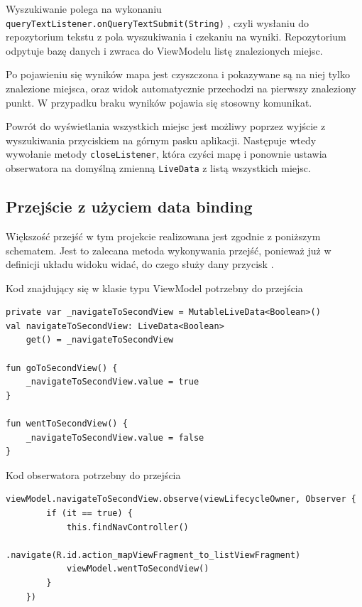 \documentclass[polish,polish,a4paper,12pt]{article}
\begin{document}
	Wyszukiwanie polega na wykonaniu \texttt{queryTextListener.onQueryTextSubmit(String)} \cite{androidapi}, czyli wysłaniu do repozytorium tekstu z pola wyszukiwania i czekaniu na wyniki. Repozytorium odpytuje bazę danych i zwraca do ViewModelu listę znalezionych miejsc.

	Po pojawieniu się wyników mapa jest czyszczona i pokazywane są na niej tylko znalezione miejsca, oraz widok automatycznie przechodzi na pierwszy znaleziony punkt. W przypadku braku wyników pojawia się stosowny komunikat.

	Powrót do wyświetlania wszystkich miejsc jest możliwy poprzez wyjście z wyszukiwania przyciskiem na górnym pasku aplikacji. Następuje wtedy wywołanie metody \texttt{closeListener}, która czyści mapę i ponownie ustawia obserwatora na domyślną zmienną \texttt{LiveData} z listą wszystkich miejsc.

	\subsection{Przejście z użyciem data binding}\label{navigation}

	Większość przejść w tym projekcie realizowana jest zgodnie z poniższym schematem. Jest to zalecana metoda wykonywania przejść, ponieważ już w definicji układu widoku widać, do czego służy dany przycisk \cite{kotlin}.

	\begin{listing}[H]
		\caption{Kod znajdujący się w klasie typu ViewModel potrzebny do przejścia}
		\begin{verbatim}
private var _navigateToSecondView = MutableLiveData<Boolean>()
val navigateToSecondView: LiveData<Boolean>
	get() = _navigateToSecondView

fun goToSecondView() {
	_navigateToSecondView.value = true
}

fun wentToSecondView() {
	_navigateToSecondView.value = false
}
		\end{verbatim}
		\label{listing:navigationviewmodel}
	\end{listing}

	\begin{listing}[H]
		\caption{Kod obserwatora potrzebny do przejścia}
		\begin{verbatim}
viewModel.navigateToSecondView.observe(viewLifecycleOwner, Observer {
		if (it == true) {
			this.findNavController()
				.navigate(R.id.action_mapViewFragment_to_listViewFragment)
			viewModel.wentToSecondView()
		}
	})
		\end{verbatim}
		\label{listing:navigationview}
	\end{listing}
\end{document}
